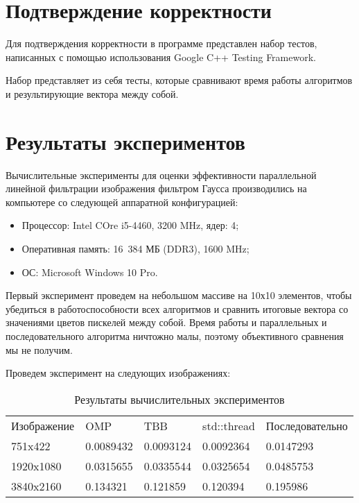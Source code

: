 \documentclass{report}
\begin{document}
\section*{Подтверждение корректности}
Для подтверждения корректности в программе представлен набор тестов, написанных с помощью использования Google C++ Testing Framework.
\par Набор представляет из себя тесты, которые сравнивают время работы алгоритмов и результирующие вектора между собой.
\newpage

\section*{Результаты экспериментов}
Вычислительные эксперименты для оценки эффективности параллельной линейной фильтрации изображения фильтром Гаусса производились на компьютере со следующей аппаратной конфигурацией:

\begin{itemize}
\item Процессор: Intel COre i5-4460, 3200 MHz, ядер: 4;
\item Оперативная память: 16 384 МБ (DDR3), 1600 MHz;
\item ОС: Microsoft Windows 10 Pro.
\end{itemize}

\par Первый эксперимент проведем на небольшом массиве на 10х10 элементов, чтобы убедиться в работоспособности всех алгоритмов и сравнить итоговые вектора со значениями цветов пискелей между собой. Время работы и параллельных и последовательного алгоритма ничтожно малы, поэтому объективного сравнения мы не получим.
\par Проведем эксперимент на следующих изображениях:

\begin{table}[!h]
\caption{Результаты вычислительных экспериментов}
\centering
\begin{tabular}{p{3cm} p{3cm} p{3cm} p{3cm} p{3cm}}
Изображение    & OMP        & TBB       & std::thread  & Последовательно   \\
751x422        & 0.0089432  & 0.0093124 & 0.0092364 & 0.0147293 \\
1920x1080      & 0.0315655  & 0.0335544 & 0.0325654 & 0.0485753  \\
3840x2160      & 0.134321  & 0.121859 & 0.120394 & 0.195986
\end{tabular}
\end{table}
\end{document}
